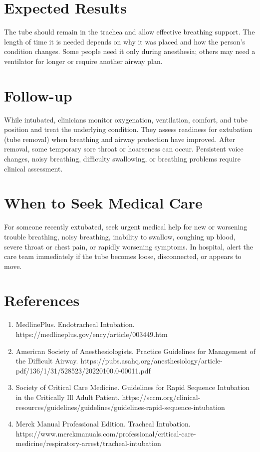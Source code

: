 \section*{Expected Results}
The tube should remain in the trachea and allow effective breathing support. The length of time it is needed depends on why it was placed and how the person's condition changes. Some people need it only during anesthesia; others may need a ventilator for longer or require another airway plan.

\section*{Follow-up}
While intubated, clinicians monitor oxygenation, ventilation, comfort, and tube position and treat the underlying condition. They assess readiness for extubation (tube removal) when breathing and airway protection have improved. After removal, some temporary sore throat or hoarseness can occur. Persistent voice changes, noisy breathing, difficulty swallowing, or breathing problems require clinical assessment.

\section*{When to Seek Medical Care}
For someone recently extubated, seek urgent medical help for new or worsening trouble breathing, noisy breathing, inability to swallow, coughing up blood, severe throat or chest pain, or rapidly worsening symptoms. In hospital, alert the care team immediately if the tube becomes loose, disconnected, or appears to move.

\section*{References}
\begin{enumerate}
  \item MedlinePlus. Endotracheal Intubation. https://medlineplus.gov/ency/article/003449.htm
  \item American Society of Anesthesiologists. Practice Guidelines for Management of the Difficult Airway. https://pubs.asahq.org/anesthesiology/article-pdf/136/1/31/528523/20220100.0-00011.pdf
  \item Society of Critical Care Medicine. Guidelines for Rapid Sequence Intubation in the Critically Ill Adult Patient. https://sccm.org/clinical-resources/guidelines/guidelines/guidelines-rapid-sequence-intubation
  \item Merck Manual Professional Edition. Tracheal Intubation. https://www.merckmanuals.com/professional/critical-care-medicine/respiratory-arrest/tracheal-intubation
\end{enumerate}

\clearpage
